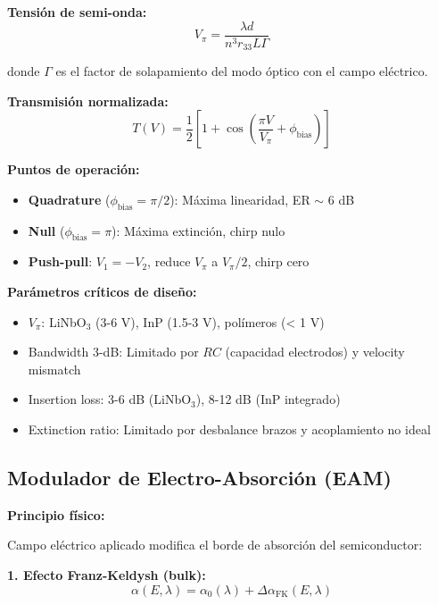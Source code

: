 \documentclass[11pt,a4paper]{article}
\begin{document}
\textbf{Tensión de semi-onda:}
\begin{equation}
    V_\pi = \frac{\lambda d}{n^3 r_{33} L \Gamma}
\end{equation}

donde $\Gamma$ es el factor de solapamiento del modo óptico con el campo eléctrico.

\textbf{Transmisión normalizada:}
\begin{equation}
    T(V) = \frac{1}{2}\left[1 + \cos\left(\frac{\pi V}{V_\pi} + \phi_{\text{bias}}\right)\right]
\end{equation}

\textbf{Puntos de operación:}
\begin{itemize}
    \item \textbf{Quadrature} ($\phi_{\text{bias}} = \pi/2$): Máxima linearidad, ER $\sim$ 6 dB
    \item \textbf{Null} ($\phi_{\text{bias}} = \pi$): Máxima extinción, chirp nulo
    \item \textbf{Push-pull}: $V_1 = -V_2$, reduce $V_\pi$ a $V_\pi/2$, chirp cero
\end{itemize}

\begin{importante}
\textbf{Parámetros críticos de diseño:}
\begin{itemize}
    \item $V_\pi$: LiNbO$_3$ (3-6 V), InP (1.5-3 V), polímeros (< 1 V)
    \item Bandwidth 3-dB: Limitado por $RC$ (capacidad electrodos) y velocity mismatch
    \item Insertion loss: 3-6 dB (LiNbO$_3$), 8-12 dB (InP integrado)
    \item Extinction ratio: Limitado por desbalance brazos y acoplamiento no ideal
\end{itemize}
\end{importante}

\subsection{Modulador de Electro-Absorción (EAM)}

\textbf{Principio físico:}

Campo eléctrico aplicado modifica el borde de absorción del semiconductor:

\textbf{1. Efecto Franz-Keldysh (bulk):}
\begin{equation}
    \alpha(E, \lambda) = \alpha_0(\lambda) + \Delta\alpha_{\text{FK}}(E, \lambda)
\end{equation}
\end{document}
